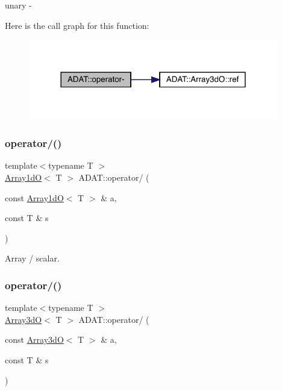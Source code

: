 unary -\/ 

Here is the call graph for this function\+:\nopagebreak
\begin{figure}[H]
\begin{center}
\leavevmode
\includegraphics[width=309pt]{d5/d0d/namespaceADAT_a891c59cca15a986469283c3b0c8c8b9f_cgraph}
\end{center}
\end{figure}
\mbox{\label{namespaceADAT_a32b40ea36b55f2b40457eb0c0ad63d90}} 
\subsubsection{\texorpdfstring{operator/()}{operator/()}\hspace{0.1cm}{\footnotesize\ttfamily [1/2]}}
{\footnotesize\ttfamily template$<$typename T $>$ \\
\mbox{\hyperlink{classADAT_1_1Array1dO}{Array1dO}}$<$ T $>$ A\+D\+A\+T\+::operator/ (\begin{DoxyParamCaption}\item[{const \mbox{\hyperlink{classADAT_1_1Array1dO}{Array1dO}}$<$ T $>$ \&}]{a,  }\item[{const T \&}]{s }\end{DoxyParamCaption})\hspace{0.3cm}{\ttfamily [inline]}}



Array / scalar. 

\mbox{\label{namespaceADAT_a12fe989a3965397dc5f1f6003582023f}} 
\subsubsection{\texorpdfstring{operator/()}{operator/()}\hspace{0.1cm}{\footnotesize\ttfamily [2/2]}}
{\footnotesize\ttfamily template$<$typename T $>$ \\
\mbox{\hyperlink{classADAT_1_1Array3dO}{Array3dO}}$<$ T $>$ A\+D\+A\+T\+::operator/ (\begin{DoxyParamCaption}\item[{const \mbox{\hyperlink{classADAT_1_1Array3dO}{Array3dO}}$<$ T $>$ \&}]{a,  }\item[{const T \&}]{s }\end{DoxyParamCaption})\hspace{0.3cm}{\ttfamily [inline]}}



